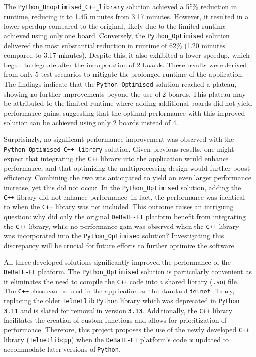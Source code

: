 The \texttt{Python\_Unoptimised\_C++\_library} solution achieved a 55\% reduction in runtime, reducing it to 1.45 minutes from 3.17 minutes. However, it resulted in a lower speedup compared to the original, likely due to the limited runtime achieved using only one board. Conversely, the \texttt{Python\_Optimised} solution delivered the most substantial reduction in runtime of 62\% (1.20 minutes compared to 3.17 minutes). Despite this, it also exhibited a lower speedup, which began to degrade after the incorporation of 2 boards. These results were derived from only 5 test scenarios to mitigate the prolonged runtime of the application. The findings indicate that the \texttt{Python\_Optimised} solution reached a plateau, showing no further improvements beyond the use of 2 boards. This plateau may be attributed to the limited runtime where adding additional boards did not yield performance gains, suggesting that the optimal performance with this improved solution can be achieved using only 2 boards instead of 4.

Surprisingly, no significant performance improvement was observed with the \texttt{Python\_Optimised\_C++\_library} solution. Given previous results, one might expect that integrating the \texttt{C++} library into the application would enhance performance, and that optimizing the multiprocessing design would further boost efficiency. Combining the two was anticipated to yield an even larger performance increase, yet this did not occur. In the \texttt{Python\_Optimised} solution, adding the \texttt{C++} library did not enhance performance; in fact, the performance was identical to when the \texttt{C++} library was not included. This outcome raises an intriguing question: why did only the original \texttt{DeBaTE-FI} platform benefit from integrating the \texttt{C++} library, while no performance gain was observed when the \texttt{C++} library was incorporated into the \texttt{Python\_Optimised} solution? Investigating this discrepancy will be crucial for future efforts to further optimize the software.

All three developed solutions significantly improved the performance of the \texttt{DeBaTE-FI} platform. The \texttt{Python\_Optimised} solution is particularly convenient as it eliminates the need to compile the \texttt{C++} code into a shared library (\texttt{.so}) file. The \texttt{C++} class can be used in the application as the standard \texttt{telnet} library, replacing the older \texttt{Telnetlib} \texttt{Python} library which was deprecated in \texttt{Python 3.11} and is slated for removal in version \texttt{3.13}\cite{PythonTelnetlib}. Additionally, the \texttt{C++} library facilitates the creation of custom functions and allows for prioritization of performance. Therefore, this project proposes the use of the newly developed \texttt{C++} library (\texttt{Telnetlibcpp}) when the \texttt{DeBaTE-FI} platform's code is updated to accommodate later versions of \texttt{Python}.

